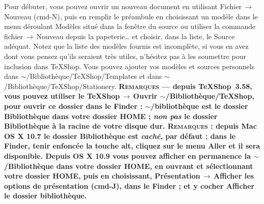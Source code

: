 \documentclass[11pt,french]{article}
\newcommand{\TS}{\textsf{\TeX Shop}}
\newcommand{\cmd}[1]{\textsf{#1}}
\newcommand{\mnu}[1]{\textsf{#1}}
\newcommand{\To}{\,\(\to\)\,}
\begin{document}
Pour débuter, vous pouvez ouvrir un nouveau document en utilisant \mnu{Fichier}\To\mnu{Nouveau} \mbox{(\cmd{cmd-N})}, puis en remplir le préambule en choisissant un modèle dans le menu déroulant \mnu{Modèles} situé dans la fenêtre du source ou utiliser la commande \mnu{fichier}\To\mnu{Nouveau depuis la papeterie…} et choisir, dans la liste, le \mnu{Source} adéquat. Notez que la liste des modèles fournis est incomplète, si vous en avez dont vous pensez qu'ils seraient très utiles, n'hésitez pas à les soumettre pour inclusion dans \TS. Vous pouvez ajouter vos modèles et sources personnels dans \cmd{$\sim$/Bibliothèque/TeXShop/Templates} et dans \cmd{$\sim$/Bibliothèque/TeXShop/Stationery}. \textbf{\textsc{Remarques} ---  depuis \TS\ 3.58, vous pouvez utiliser le \mnu{TeXShop}\To\mnu{Ouvrir \cmd{$\sim$/Bibliothèque/TeXShop}}, pour ouvrir ce dossier dans le Finder : \cmd{$\sim$/bibliothèque} est le dossier \cmd{Bibliothèque} dans votre dossier \cmd{HOME} ; \emph{non pas} le dossier \cmd{Bibliothèque} à la \cmd{racine} de votre disque dur. \textsc{Remarques} : depuis \textsf{Mac OS X 10.7} le dossier \cmd{Bibliothèque} est \emph{caché}, par défaut ; dans le \cmd{Finder}, tenir enfoncée la touche \cmd{alt}, cliquez sur le menu \mnu{Aller} et il sera disponible. Depuis \textsf{OS X 10.9} vous pouvez afficher en permanence la \cmd{$\sim$/Bibliothèque} dans votre dossier \cmd{HOME}, en ouvrant et sélectionnant votre dossier \cmd{HOME}, puis en choisissant, \mnu{Présentation}\To\mnu{Afficher les options de présentation} (\cmd{cmd-J}), dans le \cmd{Finder} ; et y cocher \cmd{Afficher le dossier bibliothèque}.}

\end{document}
